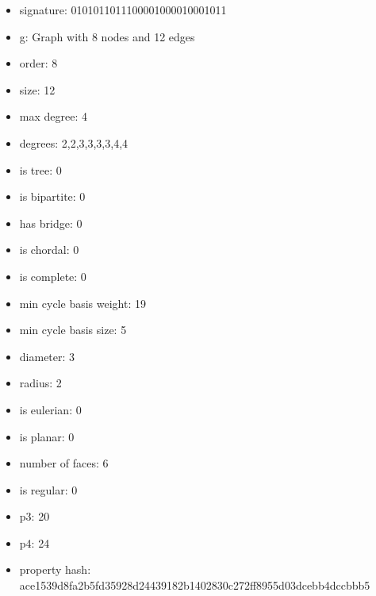 \begin{itemize}
\item signature: 0101011011100001000010001011
\item g: Graph with 8 nodes and 12 edges
\item order: 8
\item size: 12
\item max degree: 4
\item degrees: 2,2,3,3,3,3,4,4
\item is tree: 0
\item is bipartite: 0
\item has bridge: 0
\item is chordal: 0
\item is complete: 0
\item min cycle basis weight: 19
\item min cycle basis size: 5
\item diameter: 3
\item radius: 2
\item is eulerian: 0
\item is planar: 0
\item number of faces: 6
\item is regular: 0
\item p3: 20
\item p4: 24
\item property hash: ace1539d8fa2b5fd35928d24439182b1402830c272ff8955d03dcebb4dccbbb5
\end{itemize}
\newpage
\begin{figure}
\end{figure}

